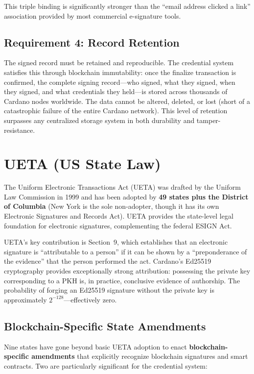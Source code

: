 This triple binding is significantly stronger than the ``email address
clicked a link'' association provided by most commercial e-signature tools.

\subsection{Requirement 4: Record Retention}

The signed record must be retained and reproducible.  The credential system
satisfies this through blockchain immutability: once the finalize transaction
is confirmed, the complete signing record---who signed, what they signed,
when they signed, and what credentials they held---is stored across
thousands of Cardano nodes worldwide.  The data cannot be altered, deleted,
or lost (short of a catastrophic failure of the entire Cardano network).
This level of retention surpasses any centralized storage system in both
durability and tamper-resistance.


\section{UETA (US State Law)}
\label{sec:ueta}

The Uniform Electronic Transactions Act (UETA) was drafted by the Uniform
Law Commission in 1999 and has been adopted by \textbf{49 states plus the
District of Columbia} (New York is the sole non-adopter, though it has its
own Electronic Signatures and Records Act).  UETA provides the state-level
legal foundation for electronic signatures, complementing the federal ESIGN
Act.

UETA's key contribution is Section~9, which establishes that an electronic
signature is ``attributable to a person'' if it can be shown by a
``preponderance of the evidence'' that the person performed the act.
Cardano's Ed25519 cryptography provides exceptionally strong attribution:
possessing the private key corresponding to a PKH is, in practice,
conclusive evidence of authorship.  The probability of forging an Ed25519
signature without the private key is approximately $2^{-128}$---effectively
zero.

\subsection{Blockchain-Specific State Amendments}

Nine states have gone beyond basic UETA adoption to enact
\textbf{blockchain-specific amendments} that explicitly recognize blockchain
signatures and smart contracts.  Two are particularly significant for the
credential system:

